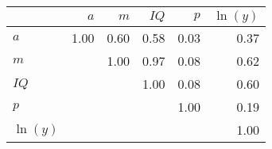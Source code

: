 \begin{tabular}{lrrrrr}
\hline
 & $a$  & $m$  & $IQ$  & $p$  & $\ln(y)$  \\
\hline
$a$ & 1.00  & 0.60  & 0.58  & 0.03  & 0.37  \\
$m$ &   & 1.00  & 0.97  & 0.08  & 0.62  \\
$IQ$ &   &   & 1.00  & 0.08  & 0.60  \\
$p$ &   &   &   & 1.00  & 0.19  \\
$\ln(y)$ &   &   &   &   & 1.00  \\
\hline
\end{tabular}%
